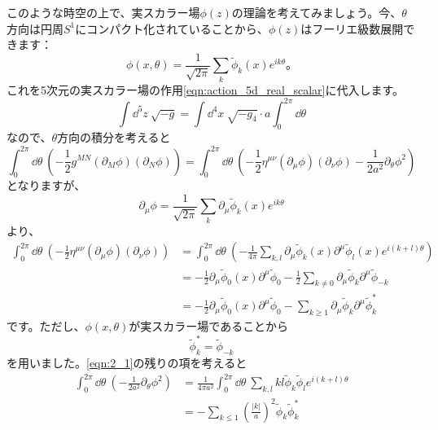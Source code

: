 \documentclass[unicode,a4paper,10pt]{ltjsarticle}
\begin{document}
このような時空の上で、実スカラー場$\phi(z)$の理論を考えてみましょう。今、$\theta$方向は円周$S^{1}$にコンパクト化されていることから、$\phi(z)$はフーリエ級数展開できます：
\begin{equation}
   \phi(x,\theta)
   =
   \frac{1}{\sqrt{2\pi}}
   \sum_{k}\tilde{\phi}_{k}(x)e^{ik\theta}
   \text{。}
\end{equation}
これを5次元の実スカラー場の作用\eqref{eqn:action_5d_real_scalar}に代入します。
\begin{equation}
   \int\dd^5 z\ 
   \sqrt{-g}
   =
   \int\dd^4 x\ \sqrt{-g_{4}}
   \cdot
   a\int_{0}^{2\pi}\dd \theta
\end{equation}
なので、$\theta$方向の積分を考えると
\begin{equation}
   \int_{0}^{2\pi}\dd \theta\ 
   \left(  
      -\frac{1}{2}g^{MN}(\partial_{M}\phi)(\partial_{N}\phi)
   \right)
   =
   \int_{0}^{2\pi}\dd \theta\ 
   \left(  
      -
      \frac{1}{2}\eta^{\mu\nu}(\partial_{\mu}\phi)(\partial_{\nu}\phi)
      -
      \frac{1}{2a^2}\partial_{\theta}\phi^2
   \right)   
   \label{eqn:2_1}
\end{equation}
となりますが、
\begin{equation}
   \partial_{\mu}\phi
   =
   \frac{1}{\sqrt{2\pi}}
   \sum_{k}\partial_{\mu}\tilde{\phi}_{k}(x)e^{ik\theta}
\end{equation}
より、
\begin{align}
   \int_{0}^{2\pi}\dd \theta\ 
   \left(  
      -
      \frac{1}{2}\eta^{\mu\nu}(\partial_{\mu}\phi)(\partial_{\nu}\phi)
   \right)   
   &=
   \int_{0}^{2\pi}\dd \theta\ 
   \left(  
      -\frac{1}{4\pi}\sum_{k,l}\partial_{\mu}\tilde{\phi}_{k}(x)\partial^{\mu}\tilde{\phi}_{l}(x)e^{i(k+l)\theta}
   \right)
   \nonumber
   \\
   &=
   -\frac{1}{2}\partial_{\mu}\tilde{\phi}_{0}(x)\partial^{\mu}\tilde{\phi}_{0}
   -\frac{1}{2}\sum_{k\neq 0}\partial_{\mu}\tilde{\phi}_{k}\partial^{\mu}\tilde{\phi}_{-k}
   \nonumber
   \\
   &=
   -\frac{1}{2}\partial_{\mu}\tilde{\phi}_{0}(x)\partial^{\mu}\tilde{\phi}_{0}
   -\sum_{k\geq 1}\partial_{\mu}\tilde{\phi}_{k}\partial^{\mu}\tilde{\phi}_{k}^{\ast}
\end{align}
です。ただし、$\phi(x,\theta)$が実スカラー場であることから
\begin{equation}
   \tilde{\phi}_{k}^{\ast}=\tilde{\phi}_{-k}
\end{equation}
を用いました。\eqref{eqn:2_1}の残りの項を考えると
\begin{align}
   \int_{0}^{2\pi}\dd \theta\ 
   \left(  
      -
      \frac{1}{2a^2}\partial_{\theta}\phi^2
   \right)   
   &=   
   \frac{1}{4\pi a^2}
   \int_{0}^{2\pi}\dd \theta\ 
   \sum_{k,l}kl\tilde{\phi}_{k}\tilde{\phi}_{l}e^{i(k+l)\theta}
   \nonumber
   \\
   &=
   -\sum_{k\leq 1}\left( \frac{|k|}{a} \right)^2 \tilde{\phi}_{k}\tilde{\phi}_{k}^{\ast}
\end{align}
\end{document}
